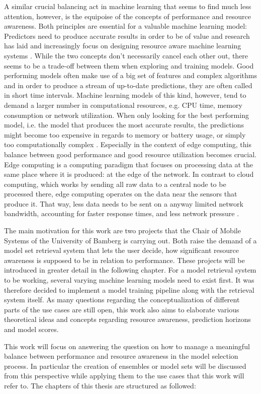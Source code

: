 A similar crucial balancing act in machine learning that seems to find much less attention, however, is the equipoise of the concepts of performance and resource awareness. Both principles are essential for a valuable machine learning model: Predictors need to produce accurate results in order to be of value and research has laid and increasingly focus on designing resource aware machine learning systems \cite{rapp2022}. While the two concepts don’t necessarily cancel each other out, there seems to be a trade-off between them when exploring and training models. Good performing models often make use of a big set of features and complex algorithms and in order to produce a stream of up-to-date predictions, they are often called in short time intervals. Machine learning models of this kind, however, tend to demand a larger number in computational resources, e.g. CPU time, memory consumption or network utilization. When only looking for the best performing model, i.e. the model that produces the most accurate results, the predictions might become too expensive in regards to memory or battery usage, or simply too computationally complex \cite{preuveneers2020}. Especially in the context of edge computing, this balance between good performance and good resource utilization becomes crucial. Edge computing is a computing paradigm that focuses on processing data at the same place where it is produced: at the edge of the network. In contrast to cloud computing, which works by sending all raw data to a central node to be processed there, edge computing operates on the data near the sensors that produce it. That way, less data needs to be sent on a anyway limited network bandwidth, accounting for faster response times, and less network pressure \cite{shi2016}.

The main motivation for this work are two projects that the Chair of Mobile Systems of the University of Bamberg is carrying out. Both raise the demand of a model set retrieval system that lets the user decide, how significant resource awareness is supposed to be in relation to performance. These projects will be introduced in greater detail in the following chapter. For a model retrieval system to be working, several varying machine learning models need to exist first. It was therefore decided to implement a model training pipeline along with the retrieval system itself. As many questions regarding the conceptualization of different parts of the use cases are still open, this work also aims to elaborate various theoretical ideas and concepts regarding resource awareness, prediction horizons and model scores.

This work will focus on answering the question on how to manage a meaningful balance between performance and resource awareness in the model selection process. In particular the creation of ensembles or model sets will be discussed from this perspective while applying them to the use cases that this work will refer to. The chapters of this thesis are structured as followed: 
